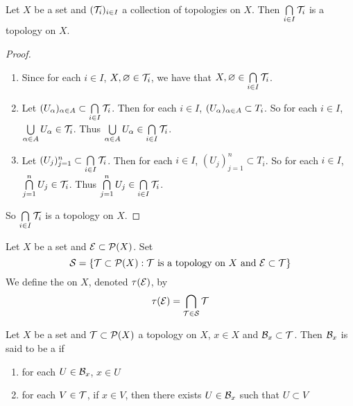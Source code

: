 \documentclass{book}
\begin{document}
	\begin{ex}  
		Let $X$ be a set and $(\mathcal{T}_{i})_{i \in I}$ a collection of topologies on $X$. Then $\bigcap\limits_{i \in I}\mathcal{T}_i$ is a topology on $X$.
	\end{ex}
	
	\begin{proof}\
	\begin{enumerate}
	\item Since for each $i \in I$, $X, \varnothing \in \mathcal{T}_{i}$, we have that $X, \varnothing \in \bigcap\limits_{i \in I}\mathcal{T}_i$.
	\item Let $(U_{\alpha})_{\alpha \in A} \subset \bigcap\limits_{i \in I}\mathcal{T}_i$. Then for each $i \in I$, $(U_{\alpha})_{\alpha \in A} \subset T_i$. So for each $i \in I$, $\bigcup\limits_{\alpha \in A}U_{\alpha} \in \mathcal{T}_i$. Thus $\bigcup\limits_{\alpha \in A}U_{\alpha} \in \bigcap\limits_{i \in I}\mathcal{T}_i$.
	\item Let $(U_{j})_{j=1}^n \subset \bigcap\limits_{i \in I}\mathcal{T}_i$. Then for each $i \in I$, $(U_{j})_{j=1}^n \subset T_i$. So for each $i \in I$, $\bigcap\limits_{j=1}^n U_{j} \in \mathcal{T}_i$. Thus $\bigcap\limits_{j=1}^n U_{j} \in \bigcap\limits_{i \in I}\mathcal{T}_i$.
	\end{enumerate}
	So $\bigcap\limits_{i \in I}\mathcal{T}_i$ is a topology on $X$.
	\end{proof}
	
	\begin{defn} 
	Let $X$ be a set and $\mathcal{E} \subset \mathcal{P}(X)$. Set 
	\begin{equation*}
	\mathcal{S} = \{\mathcal{T} \subset \mathcal{P}(X): \mathcal{T} \text{ is a topology 	on $X$ and $\mathcal{E} \subset \mathcal{T}$}\}
	\end{equation*}	 
We define the  on $X$, denoted $\tau(\mathcal{E})$, by $$\tau(\mathcal{E}) = \bigcap_{\mathcal{T} \in \mathcal{S}} \mathcal{T}$$
	\end{defn}

	
	\begin{defn} 
	Let $X$ be a set and $\mathcal{T} \subset \mathcal{P}(X)$ a topology on $X$, $x \in X$ and $\mathcal{B}_x \subset \mathcal{T}$. Then $\mathcal{B}_x$ is said to be a  if 
	\begin{enumerate}
	\item for each $U \in \mathcal{B}_x$, $x \in U$
	\item for each $V \in \mathcal{T}$, if $x \in V$, then there exists $U \in \mathcal{B}_x$ such that $U \subset V$
	\end{enumerate}
	\end{defn}
	
\end{document}
